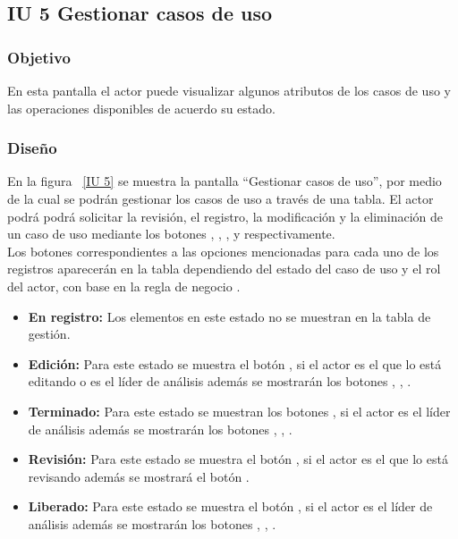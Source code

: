 \subsection{IU 5 Gestionar casos de uso}
\subsubsection{Objetivo}
	
	En esta pantalla el actor puede visualizar algunos atributos de los casos de uso y las operaciones disponibles de acuerdo su estado.

\subsubsection{Diseño}

    En la figura ~\ref{IU 5} se muestra la pantalla ``Gestionar casos de uso'', por medio de la cual 
    se podrán gestionar los casos de uso a través de una tabla.
    El actor podrá podrá solicitar la revisión, el registro, la modificación y la eliminación de un caso de uso mediante los botones
    \btnRevisar, , \btnConsulta, \btnEditar y \btnEliminar respectivamente. \\
    
    Los botones correspondientes a las opciones mencionadas para cada uno de los registros aparecerán en la tabla dependiendo del estado
    del caso de uso y el rol del actor, con base en la regla de negocio .
    	
    \begin{itemize}
	    \item {\bf En registro:} Los elementos en este estado no se muestran en la tabla de gestión.
	    \item {\bf Edición:} Para este estado se muestra el botón \btnConsulta, si el actor es el que lo está editando o es el líder de análisis además se mostrarán los botones \btnEditar, \btnTray, \btnExt.
            \item {\bf Terminado:} Para este estado se muestran los botones \btnConsulta \btnRevisar \btnEliminar, si el actor es el líder de análisis además se mostrarán los botones \btnEditar, \btnTray, \btnExt.
            \item {\bf Revisión:} Para este estado se muestra el botón \btnConsulta, si el actor es el que lo está revisando además se mostrará el botón \btnRevisar.
            \item {\bf Liberado:} Para este estado se muestra el botón \btnConsulta, si el actor es el líder de análisis además se mostrarán los botones \btnEditar, \btnTray, \btnExt.
    \end{itemize}


